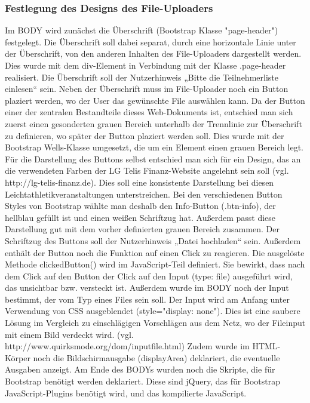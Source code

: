 {\subsubsection{Festlegung des Designs des File-Uploaders}
Im BODY wird zunächst die Überschrift (Bootstrap Klasse "page-header") festgelegt. Die Überschrift soll dabei separat, durch eine horizontale Linie unter der Überschrift, von den anderen Inhalten des File-Uploaders dargestellt werden. Dies wurde mit dem div-Element in Verbindung mit der Klasse .page-header realisiert. Die Überschrift soll der Nutzerhinweis „Bitte die Teilnehmerliste einlesen“ sein.
Neben der Überschrift muss im File-Uploader noch ein Button plaziert werden, wo der User das gewünschte File auswählen kann. Da der Button einer der zentralen Bestandteile dieses Web-Dokuments ist, entschied man sich zuerst einen gesonderten grauen Bereich unterhalb der Trennlinie zur Überschrift zu definieren, wo später der Button plaziert werden soll. Dies wurde mit der Bootstrap Wells-Klasse umgesetzt, die um ein Element einen grauen Bereich legt. 
Für die Darstellung des Buttons selbst entschied man sich für ein Design, das an die verwendeten Farben der LG Telis Finanz-Website angelehnt sein soll (vgl. http://lg-telis-finanz.de). Dies soll eine konsistente Darstellung bei diesen Leichtathletikveranstaltungen unterstreichen. Bei den verschiedenen Button Styles von Bootstrap wählte man deshalb den Info-Button (.btn-info), der hellblau gefüllt ist und einen weißen Schriftzug hat. Außerdem passt diese Darstellung gut mit dem vorher definierten grauen Bereich zusammen. Der Schriftzug des Buttons soll der Nutzerhinweis „Datei hochladen“ sein. Außerdem enthält der Button noch die Funktion auf einen Click zu reagieren. Die ausgelöste Methode clickedButton() wird im JavaScript-Teil definiert. Sie bewirkt, dass nach dem Click auf den Button der Click auf den Input (type: file) ausgeführt wird, das unsichtbar bzw. versteckt ist.
Außerdem wurde im BODY noch der Input bestimmt, der vom Typ eines Files sein soll. Der Input wird am Anfang unter Verwendung von CSS ausgeblendet (style="display: none"). Dies ist eine saubere Lösung im Vergleich zu einschlägigen Vorschlägen aus dem Netz, wo der Fileinput mit einem Bild verdeckt wird. (vgl. http://www.quirksmode.org/dom/inputfile.html)
Zudem wurde im HTML-Körper noch die Bildschirmausgabe (displayArea) deklariert, die eventuelle Ausgaben anzeigt. 
Am Ende des BODYs wurden noch die Skripte, die für Bootstrap benötigt werden deklariert. Diese sind jQuery, das für Bootstrap JavaScript-Plugins benötigt wird, und das kompilierte JavaScript.  

}
